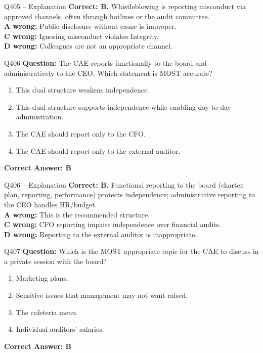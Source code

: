 \documentclass[aspectratio=169,10pt]{beamer}
\begin{document}
	\begin{frame}[t]{Q405 -- Explanation}
		\small
		\textbf{Correct: B.} Whistleblowing is reporting misconduct via approved channels, often through hotlines or the audit committee. \\[4pt]
		\textbf{A wrong:} Public disclosure without cause is improper. \\[2pt]
		\textbf{C wrong:} Ignoring misconduct violates Integrity. \\[2pt]
		\textbf{D wrong:} Colleagues are not an appropriate channel.
	\end{frame}
	
	\begin{frame}[t]{Q406}
		\small
		\textbf{Question:} The CAE reports functionally to the board and administratively to the CEO. Which statement is MOST accurate?
		\begin{enumerate}[label=\Alph*.,itemsep=1pt,topsep=2pt]
			\item This dual structure weakens independence.
			\item This dual structure supports independence while enabling day-to-day administration.
			\item The CAE should report only to the CFO.
			\item The CAE should report only to the external auditor.
		\end{enumerate}
		\vspace{4pt}
		\textbf{Correct Answer: B}
	\end{frame}
	
	\begin{frame}[t]{Q406 -- Explanation}
		\small
		\textbf{Correct: B.} Functional reporting to the board (charter, plan, reporting, performance) protects independence; administrative reporting to the CEO handles HR/budget. \\[4pt]
		\textbf{A wrong:} This is the recommended structure. \\[2pt]
		\textbf{C wrong:} CFO reporting impairs independence over financial audits. \\[2pt]
		\textbf{D wrong:} Reporting to the external auditor is inappropriate.
	\end{frame}
	
	\begin{frame}[t]{Q407}
		\small
		\textbf{Question:} Which is the MOST appropriate topic for the CAE to discuss in a private session with the board?
		\begin{enumerate}[label=\Alph*.,itemsep=1pt,topsep=2pt]
			\item Marketing plans.
			\item Sensitive issues that management may not want raised.
			\item The cafeteria menu.
			\item Individual auditors' salaries.
		\end{enumerate}
		\vspace{4pt}
		\textbf{Correct Answer: B}
	\end{frame}
	
\end{document}
